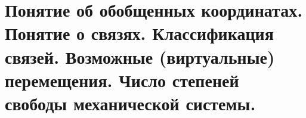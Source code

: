 \chapter{Понятие об обобщенных координатах. Понятие о связях. Классификация
связей. Возможные (виртуальные) перемещения. Число степеней свободы
механической системы.}

\newpage
